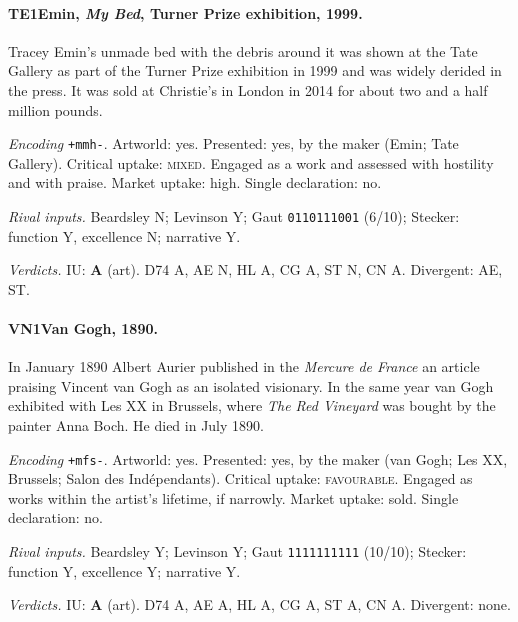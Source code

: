 \paragraph{TE1\enspace Emin, \emph{My Bed}, Turner Prize exhibition, 1999.}
Tracey Emin's unmade bed with the debris around it was shown at the Tate Gallery as part of the Turner Prize exhibition in 1999 and was widely derided in the press. It was sold at Christie's in London in 2014 for about two and a half million pounds.\par
\noindent\textit{Encoding} \texttt{+mmh-}. Artworld: yes. Presented: yes, by the maker (Emin; Tate Gallery). Critical uptake: \textsc{mixed}. Engaged as a work and assessed with hostility and with praise. Market uptake: high. Single declaration: no.\par
\noindent\textit{Rival inputs.} Beardsley N; Levinson Y; Gaut \texttt{0110111001} (6/10); Stecker: function Y, excellence N; narrative Y.\par
\noindent\textit{Verdicts.} IU: \textbf{A} (art). D74 A, AE N, HL A, CG A, ST N, CN A. Divergent: AE, ST.\par

\paragraph{VN1\enspace Van Gogh, 1890.}
In January 1890 Albert Aurier published in the \emph{Mercure de France} an article praising Vincent van Gogh as an isolated visionary. In the same year van Gogh exhibited with Les XX in Brussels, where \emph{The Red Vineyard} was bought by the painter Anna Boch. He died in July 1890.\par
\noindent\textit{Encoding} \texttt{+mfs-}. Artworld: yes. Presented: yes, by the maker (van Gogh; Les XX, Brussels; Salon des Ind\'ependants). Critical uptake: \textsc{favourable}. Engaged as works within the artist's lifetime, if narrowly. Market uptake: sold. Single declaration: no.\par
\noindent\textit{Rival inputs.} Beardsley Y; Levinson Y; Gaut \texttt{1111111111} (10/10); Stecker: function Y, excellence Y; narrative Y.\par
\noindent\textit{Verdicts.} IU: \textbf{A} (art). D74 A, AE A, HL A, CG A, ST A, CN A. Divergent: none.\par

